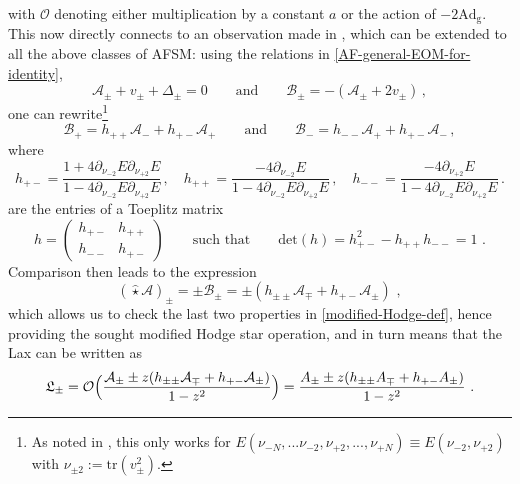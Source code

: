 \documentclass[12pt]{article}
\numberwithin{equation}{section}
\begin{document}
with $\mathcal{O}$ denoting either multiplication by a constant $a$ or the action of $-2\mathrm{Ad}_{\mathrm{g}}$. This now directly connects to an observation made in \cite{Ferko:2025bhv}, which can be extended to all the above classes of AFSM: using the relations in \eqref{AF-general-EOM-for-identity},
\begin{equation}
\mathcal{A}_{\pm}+v_{\pm}+\Delta_{\pm}=0
\qquad \text{and} \qquad 
\mathcal{B}_{\pm}=-(\mathcal{A}_{\pm}+2v_{\pm}) \, ,
\end{equation}
one can rewrite\footnote{As noted in \cite{Ferko:2025bhv}, this only works for $E(\nu_{-N},...\nu_{-2},\nu_{+2},...,\nu_{+N})\equiv E(\nu_{-2},\nu_{+2})$ with $\nu_{\pm 2}:=\mathrm{tr}(v_{\pm}^2)$.}
\begin{equation}
\mathcal{B}_{+}=h_{++}\mathcal{A}_{-}+h_{+-}\mathcal{A}_{+}
\qquad \text{and} \qquad 
\mathcal{B}_{-}=h_{--}\mathcal{A}_{+}+h_{+-}\mathcal{A}_{-} \, ,
\end{equation}
where 
\begin{equation}
h_{+-}\!=\!\frac{1\!+\!4\partial_{\nu_{-2}}E\partial_{\nu_{+2}}E}{1\!-\!4\partial_{\nu_{-2}}E\partial_{\nu_{+2}}E} \, ,
\quad 
h_{++}\!=\!\frac{-4\partial_{\nu_{-2}}E}{1\!-\!4\partial_{\nu_{-2}
}E\partial_{\nu_{+2}}E} \, ,
\quad 
h_{--}\!=\!\frac{-4\partial_{\nu_{+2}}E}{1\!-\!4\partial_{\nu_{-2}}E\partial_{\nu_{+2}}E} \, .
\end{equation}
are the entries of a Toeplitz matrix
\begin{equation}
h=
\begin{pmatrix}
h_{+-} & h_{++}
\\
h_{--} & h_{+-}
\end{pmatrix}
\qquad \text{such that} \qquad 
\mathrm{det}(h)=h_{+-}^2-h_{++}h_{--}=1 \,\,  .
\end{equation}
Comparison then leads to the expression
\begin{equation}
(\hat{\star}\mathcal{A})_{\pm}=\pm \mathcal{B}_{\pm}=\pm (h_{\pm\pm}\mathcal{A}_{\mp}+h_{+-}\mathcal{A}_{\pm}) \,\, ,
\end{equation}
which allows us to check the last two properties in \eqref{modified-Hodge-def}, hence providing the sought modified Hodge star operation, and in turn means that the Lax can be written as
\begin{equation}\label{Lax-field-dependent-metric}
\mathfrak{L}_{\pm}=\mathcal{O}\Bigl( \frac{\mathcal{A}_{\pm}\pm z (h_{\pm\pm}\mathcal{A}_{\mp}+h_{+-}\mathcal{A}_{\pm})}{1-z^2}\Bigr)=\frac{A_{\pm}\pm z(h_{\pm\pm}A_{\mp}+h_{+-}A_{\pm})}{1-z^2} \,\, .
\end{equation}
\end{document}
